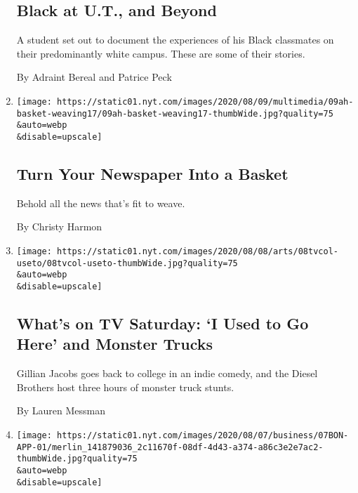 \begin{enumerate}
  \hypertarget{black-at-ut-and-beyond}{%
  \subsection{Black at U.T., and Beyond}\label{black-at-ut-and-beyond}}

  A student set out to document the experiences of his Black classmates
  on their predominantly white campus. These are some of their stories.

  By Adraint Bereal and Patrice Peck
\item
  \href{/2020/08/08/at-home/coronavirus-newspaper-basket.html}{}

  \texttt{[image: https://static01.nyt.com/images/2020/08/09/multimedia/09ah-basket-weaving17/09ah-basket-weaving17-thumbWide.jpg?quality=75\\\&auto=webp\\\&disable=upscale]}

  \hypertarget{turn-your-newspaper-into-a-basket}{%
  \subsection{Turn Your Newspaper Into a
  Basket}\label{turn-your-newspaper-into-a-basket}}

  Behold all the news that's fit to weave.

  By Christy Harmon
\item
  \href{/2020/08/08/arts/television/whats-on-tv-saturday-i-used-to-go-here-and-monster-trucks.html}{}

  \texttt{[image: https://static01.nyt.com/images/2020/08/08/arts/08tvcol-useto/08tvcol-useto-thumbWide.jpg?quality=75\\\&auto=webp\\\&disable=upscale]}

  \hypertarget{whats-on-tv-saturday-i-used-to-go-here-and-monster-trucks}{%
  \subsection{What's on TV Saturday: `I Used to Go Here' and Monster
  Trucks}\label{whats-on-tv-saturday-i-used-to-go-here-and-monster-trucks}}

  Gillian Jacobs goes back to college in an indie comedy, and the Diesel
  Brothers host three hours of monster truck stunts.

  By Lauren Messman
\item
  \href{/2020/08/07/business/media/bon-appetit-race-black-staff-quits.html}{}

  \texttt{[image: https://static01.nyt.com/images/2020/08/07/business/07BON-APP-01/merlin\_141879036\_2c11670f-08df-4d43-a374-a86c3e2e7ac2-thumbWide.jpg?quality=75\\\&auto=webp\\\&disable=upscale]}


\end{enumerate}
